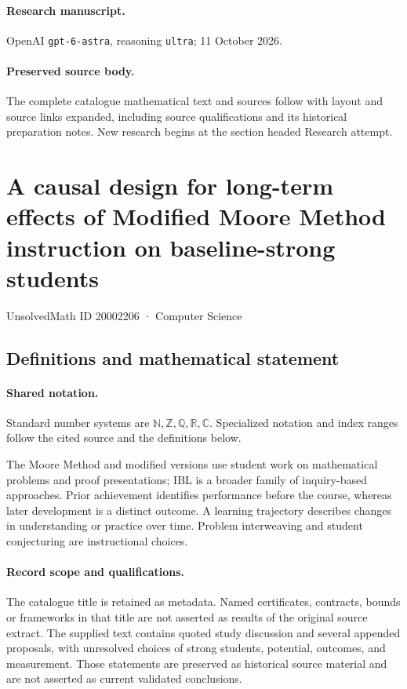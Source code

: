 \documentclass[11pt]{article}
\begin{document}
\paragraph{Research manuscript.} OpenAI \texttt{gpt-6-astra}, reasoning \texttt{ultra}; 11 October 2026.
\paragraph{Preserved source body.} The complete catalogue mathematical text and sources follow with layout and source links expanded, including source qualifications and its historical preparation notes. New research begins at the section headed Research attempt.

\section{A causal design for long-term effects of Modified Moore Method instruction on baseline-strong students}\label{20002206}
{\small UnsolvedMath ID 20002206 · Computer Science}
\subsection{Definitions and mathematical statement}

\paragraph{Shared notation.}Standard number systems are $\mathbb N,\mathbb Z,\mathbb Q,\mathbb R,\mathbb C$. Specialized notation and index ranges follow the cited source and the definitions below.


The Moore Method and modified versions use student work on mathematical problems and proof presentations; IBL is a broader family of inquiry-based approaches. Prior achievement identifies performance before the course, whereas later development is a distinct outcome. A learning trajectory describes changes in understanding or practice over time. Problem interweaving and student conjecturing are instructional choices.
\paragraph{Record scope and qualifications.}
The catalogue title is retained as metadata. Named certificates, contracts, bounds or frameworks in that title are not asserted as results of the original source extract.
The supplied text contains quoted study discussion and several appended proposals, with unresolved choices of strong students, potential, outcomes, and measurement. Those statements are preserved as historical source material and are not asserted as current validated conclusions.
\end{document}
